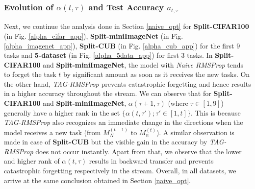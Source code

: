 \documentclass{article} \usepackage{collas2022_conference,times}
\begin{document}
\subsubsection{Evolution of $\alpha(t,\tau)$ and Test Accuracy $a_{t,\tau}$} \label{alpha_app}
    Next, we continue the analysis done in Section \ref{naive_opt} for \textbf{Split-CIFAR100} (in Fig. \ref{alpha_cifar_app}), \textbf{Split-miniImageNet}  (in Fig. \ref{alpha_imagenet_app}), \textbf{Split-CUB} (in Fig. \ref{alpha_cub_app}) for the first $9$ tasks and \textbf{5-dataset} (in Fig. \ref{alpha_5data_app}) for first $3$ tasks. In \textbf{Split-CIFAR100} and \textbf{Split-miniImageNet}, the model with \textit{Naive RMSProp} tends to forget the task $t$ by significant amount as soon as it receives the new tasks. On the other hand, \textit{TAG-RMSProp} prevents catastrophic forgetting and hence results in a higher accuracy throughout the stream. We can observe that for \textbf{Split-CIFAR100} and \textbf{Split-miniImageNet}, $\alpha(\tau+1,\tau)$ (where $\tau\in[1,9]$) generally have a higher rank in the set $\{\alpha(t,\tau');\tau'\in[1,t]\}$. This is because \textit{TAG-RMSProp} also recognizes an immediate change in the directions when the model receives a new task (from $M^{(t-1)}_N$ to $M^{(t)}_n$). A similar observation is made in case of \textbf{Split-CUB} but the visible gain in the accuracy by \textit{TAG-RMSProp} does not occur instantly. Apart from that, we observe that the lower and higher rank of $\alpha(t,\tau)$ results in backward transfer and prevents catastrophic forgetting respectively in the stream. Overall, in all datasets, we arrive at the same conclusion obtained in Section \ref{naive_opt}. 
\end{document}

